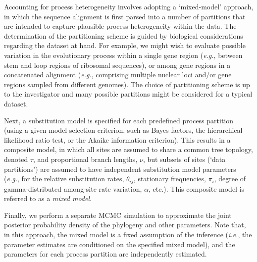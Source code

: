 \documentclass[11pt]{article}
\begin{document}
Accounting for process heterogeneity involves adopting a `mixed-model' approach, \citep{ronquist03} in which the sequence alignment is first parsed into a number of partitions that are intended to capture plausible process heterogeneity within the data.
The determination of the partitioning scheme is guided by biological considerations regarding the dataset at hand.
For example, we might wish to evaluate possible variation in the evolutionary process within a single gene region ({\it e.g.}, between stem and loop regions of ribosomal sequences), or among gene regions in a concatenated alignment ({\it e.g.}, comprising multiple nuclear loci and/or gene regions sampled from different genomes).
The choice of partitioning scheme is up to the investigator and many possible partitions might be considered for a typical dataset.

Next, a substitution model is specified for each predefined process partition (using a given model-selection criterion, such as Bayes factors, the hierarchical likelihood ratio test, or the Akaike information
criterion).
This results in a composite model, in which all sites are assumed to share a common tree topology, denoted $\tau$, and proportional branch lengths, $\nu$, but subsets of sites (`data partitions') are assumed to have independent substitution model parameters ({\it e.g.}, for the relative substitution rates, $\theta_{ij}$, stationary frequencies, $\pi_{i}$, degree of gamma-distributed among-site rate variation, $\alpha$, etc.).
This composite model is referred to as a \emph{mixed model}.

Finally, we perform a separate MCMC simulation to approximate the joint posterior probability density of the phylogeny and other parameters.  Note that, in this approach, the mixed model is a fixed assumption of the inference ({\it i.e.}, the parameter estimates are conditioned on the specified mixed model), and the parameters for each process partition are independently estimated.
\end{document}
